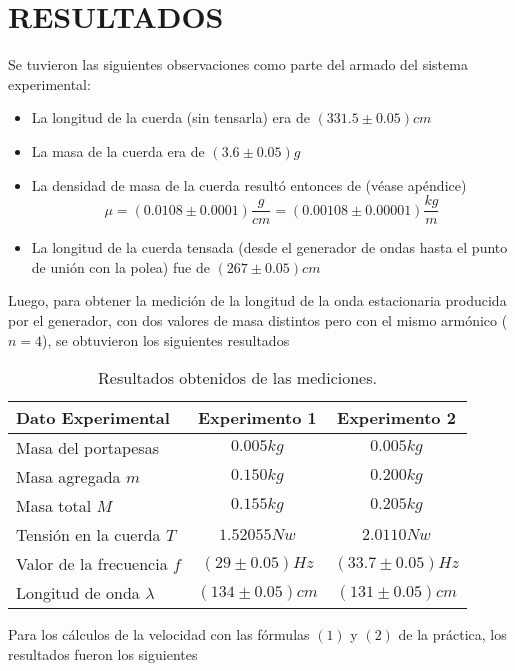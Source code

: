 \documentclass[a4paper, 10pt]{article}
\begin{document}
	\section{RESULTADOS}
	 Se tuvieron las siguientes observaciones como parte del armado del sistema experimental:
	 \begin{itemize}
	 	\item  La longitud de la cuerda (sin tensarla) era de $ (331.5\pm 0.05) cm $
	 	\item La masa de la cuerda era de $( 3.6 \pm 0.05)g $
	 	\item La densidad de masa de la cuerda resultó entonces de (véase apéndice) 
	 	$$\mu=\left(0.0108\pm0.0001\right)\dfrac{g}{cm}=(0.00108\pm 0.00001)\dfrac{kg}{m}$$
	 	\item La longitud de la cuerda tensada (desde el generador de ondas hasta el punto de unión con la polea) fue de $ (267 \pm 0.05) cm $
	 \end{itemize}
 
 	Luego, para obtener la medición de la longitud de la onda estacionaria producida por el generador, con dos valores de masa distintos pero con el mismo armónico ($n=4$), se obtuvieron los siguientes resultados 
 	 	
	\begin{table}[ht]
	\centering
	\caption{Resultados obtenidos de las mediciones.}
	 	\begin{tabular}{|l|c|c|}
		 		\hline
		 		Dato Experimental & Experimento 1 & Experimento 2 \\
		 		\hline
		 		Masa del portapesas & $ 0.005 kg $ & $ 0.005 kg $ \\
		 		\hline
		 		Masa agregada $ m $& $ 0.150 kg $ & $ 0.200 kg $  \\
		 		\hline
		 		Masa total $ M $ & $ 0.155kg $ & $ 0.205kg $  \\
		 		\hline
		 		Tensión en la cuerda $ T $ & $ 1.52055 Nw $  & $ 2.0110 Nw$ \\
		 		\hline
		 		Valor de la frecuencia $ f $ & $ (29\pm 0.05)Hz$  & $ (33.7\pm 0.05)Hz $ \\
		 		\hline
		 		Longitud de onda $ \lambda $ & $ (134\pm0.05)cm $ & $ (131\pm0.05)cm $  \\
		 		\hline
	 	\end{tabular}
 	\end{table}
 
 	Para los cálculos de la velocidad con las fórmulas $ (1) $ y $ (2) $ de la práctica, los resultados fueron los siguientes
 	
\end{document}
